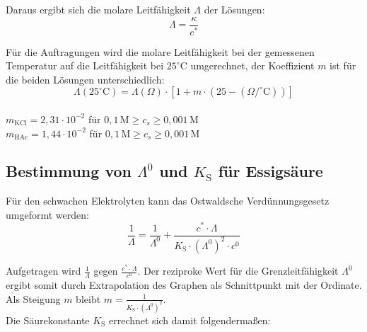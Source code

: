 \documentclass[12pt,a4paper,titlepage,headinclude,bibtotoc]{scrartcl}
\begin{document}
Daraus ergibt sich die molare Leitfähigkeit $\mathit{\Lambda}$ der Lösungen:\\

\begin{equation}
\mathit{\Lambda} = \frac{\kappa}{c^*}
\end{equation}

Für die Auftragungen wird die molare Leitfähigkeit bei der gemessenen Temperatur auf die Leitfähigkeit bei $25^\circ\text{C}$ umgerechnet, der Koeffizient $m$ ist für die beiden Lösungen unterschiedlich:\\

\begin{equation}
\mathit{\Lambda} (25^\circ\text{C}) = \mathit{\Lambda}(\Omega) \cdot [1+ m \cdot (25- (\Omega/^\circ\text{C}))]
\end{equation}\\

{\centering
$m_{\mathrm{KCl}} = 2,31 \cdot 10^{-2}$ für $0,1\, \mathrm{M} \ge c_s \ge 0,001\, \mathrm{M}$\\
$m_{\mathrm{HAc}} = 1,44 \cdot 10^{-2}$ für $0,1\, \mathrm{M} \ge c_s \ge 0,001\, \mathrm{M}$\\}



\subsection{Bestimmung von $\mathit{\Lambda^0}$ und $K_{\mathrm{S}}$ für Essigsäure}

Für den schwachen Elektrolyten kann das Ostwaldsche Verdünnungsgesetz umgeformt werden:\\

\begin{equation}
\frac{1}{\mathit{\Lambda}} = \frac{1}{\mathit{\Lambda^0}} + \frac{c^* \cdot \mathit{\Lambda}}{K_{\mathrm{S}} \cdot (\mathit{\Lambda^0})^2 \cdot c^0}
\end{equation}

Aufgetragen wird $\frac{1}{\mathit{\Lambda}}$ gegen $\frac{c^* \cdot \mathit{\Lambda}}{c^0}$.
Der reziproke Wert für die Grenzleitfähigkeit $\mathit{\Lambda^0}$ ergibt somit durch Extrapolation des Graphen als Schnittpunkt mit der Ordinate.\\
Als Steigung $m$ bleibt  $m = \frac{1}{K_{\mathrm{S}} \cdot (\mathit{\Lambda^0})^2 }$.\\
Die Säurekonstante $K_{\mathrm{S}}$ errechnet sich damit folgendermaßen:\\
\end{document}

